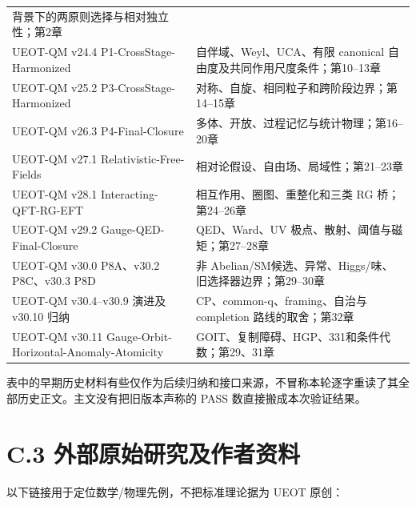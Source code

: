 \documentclass[
  11pt,
  oneside]{book}
\begin{document}
\begin{longtable}[]{@{}
  >{\raggedright\arraybackslash}p{}
  >{\raggedright\arraybackslash}p{}@{}}
背景下的两原则选择与相对独立性；第2章 \\
UEOT-QM v24.4 P1-CrossStage-Harmonized & 自伴域、Weyl、UCA、有限
canonical 自由度及共同作用尺度条件；第10--13章 \\
UEOT-QM v25.2 P3-CrossStage-Harmonized &
对称、自旋、相同粒子和跨阶段边界；第14--15章 \\
UEOT-QM v26.3 P4-Final-Closure &
多体、开放、过程记忆与统计物理；第16--20章 \\
UEOT-QM v27.1 Relativistic-Free-Fields &
相对论假设、自由场、局域性；第21--23章 \\
UEOT-QM v28.1 Interacting-QFT-RG-EFT & 相互作用、圈图、重整化和三类 RG
桥；第24--26章 \\
UEOT-QM v29.2 Gauge-QED-Final-Closure & QED、Ward、UV
极点、散射、阈值与磁矩；第27--28章 \\
UEOT-QM v30.0 P8A、v30.2 P8C、v30.3 P8D & 非
Abelian/SM候选、异常、Higgs/味、旧选择器边界；第29--30章 \\
UEOT-QM v30.4--v30.9 演进及 v30.10 归纳 & CP、common-q、framing、自治与
completion 路线的取舍；第32章 \\
UEOT-QM v30.11 Gauge-Orbit-Horizontal-Anomaly-Atomicity &
GOIT、复制障碍、HGP、331和条件代数；第29、31章 \\
\end{longtable}

表中的早期历史材料有些仅作为后续归纳和接口来源，不冒称本轮逐字重读了其全部历史正文。主文没有把旧版本声称的
PASS 数直接搬成本次验证结果。

\section{C.3 外部原始研究及作者资料}

以下链接用于定位数学/物理先例，不把标准理论据为 UEOT 原创：
\end{document}

